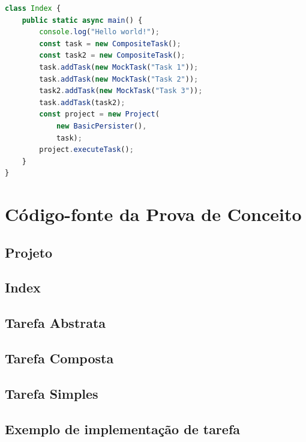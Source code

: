 \documentclass[12pt]{tcc}
\begin{document}
\begin{lstlisting}[label={lst:index_ts}, caption={Exemplo de roteiro principal para executar a prova de conceito.}, language=TypeScript]
class Index {
	public static async main() {
		console.log("Hello world!");
		const task = new CompositeTask();
		const task2 = new CompositeTask();
		task.addTask(new MockTask("Task 1"));
		task.addTask(new MockTask("Task 2"));
		task2.addTask(new MockTask("Task 3"));
		task.addTask(task2);
		const project = new Project(
			new BasicPersister(),
			task);
		project.executeTask();
	}
}
\end{lstlisting}


\appendix
\chapter{Código-fonte da Prova de Conceito}
\label{apx:mock_source}

\section{Projeto}


\section{Index}


\section{Tarefa Abstrata}


\section{Tarefa Composta}


\section{Tarefa Simples}


\section{Exemplo de implementação de tarefa}

\end{document}
